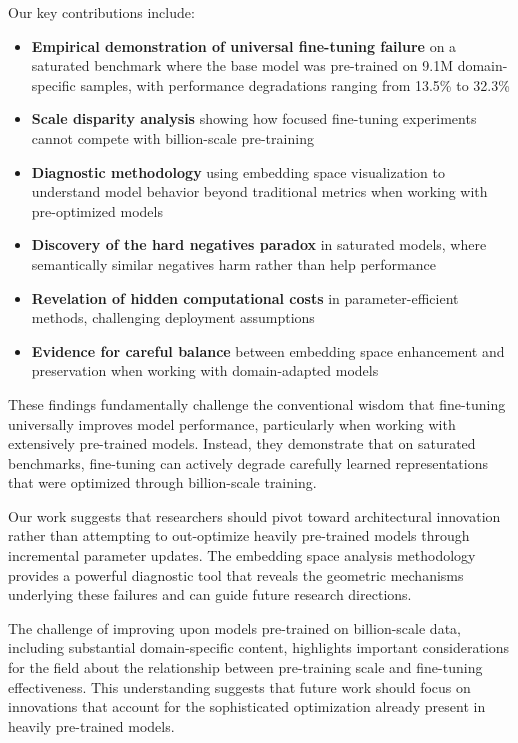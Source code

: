 \documentclass[conference]{IEEEtran}
\begin{document}
Our key contributions include:
\begin{itemize}
\item \textbf{Empirical demonstration of universal fine-tuning failure} on a saturated benchmark where the base model was pre-trained on 9.1M domain-specific samples, with performance degradations ranging from 13.5\% to 32.3\%
\item \textbf{Scale disparity analysis} showing how focused fine-tuning experiments cannot compete with billion-scale pre-training
\item \textbf{Diagnostic methodology} using embedding space visualization to understand model behavior beyond traditional metrics when working with pre-optimized models
\item \textbf{Discovery of the hard negatives paradox} in saturated models, where semantically similar negatives harm rather than help performance
\item \textbf{Revelation of hidden computational costs} in parameter-efficient methods, challenging deployment assumptions
\item \textbf{Evidence for careful balance} between embedding space enhancement and preservation when working with domain-adapted models
\end{itemize}

These findings fundamentally challenge the conventional wisdom that fine-tuning universally improves model performance, particularly when working with extensively pre-trained models. Instead, they demonstrate that on saturated benchmarks, fine-tuning can actively degrade carefully learned representations that were optimized through billion-scale training.

Our work suggests that researchers should pivot toward architectural innovation rather than attempting to out-optimize heavily pre-trained models through incremental parameter updates. The embedding space analysis methodology provides a powerful diagnostic tool that reveals the geometric mechanisms underlying these failures and can guide future research directions.

The challenge of improving upon models pre-trained on billion-scale data, including substantial domain-specific content, highlights important considerations for the field about the relationship between pre-training scale and fine-tuning effectiveness. This understanding suggests that future work should focus on innovations that account for the sophisticated optimization already present in heavily pre-trained models.
\end{document}

